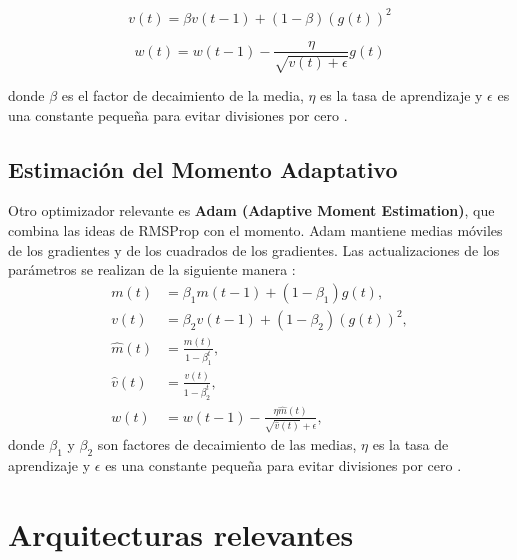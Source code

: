 \[
v(t) = \beta v(t-1) + (1-\beta) (g(t))^2
\]

\[
w(t) = w(t-1) - \frac{\eta}{\sqrt{v(t) + \epsilon}} g(t)
\]

donde \(\beta\) es el factor de decaimiento de la media, \(\eta\) es la tasa de aprendizaje y \(\epsilon\) es una constante pequeña para evitar divisiones por cero \citep{pajares2021aprendizaje}.




\subsection{Estimación del Momento Adaptativo}

Otro optimizador relevante es \textbf{Adam (Adaptive Moment Estimation)}, que combina las ideas de RMSProp con el momento. Adam mantiene medias móviles de los gradientes y de los cuadrados de los gradientes. Las actualizaciones de los parámetros se realizan de la siguiente manera \citep{pajares2021aprendizaje}:
\begin{align*}
    m(t) &= \beta_1 m(t-1) + (1-\beta_1) g(t), \\
    v(t) &= \beta_2 v(t-1) + (1-\beta_2) (g(t))^2, \\
    \hat{m}(t) &= \frac{m(t)}{1 - \beta_1^t}, \\
    \hat{v}(t) &= \frac{v(t)}{1 - \beta_2^t}, \\
    w(t) &= w(t-1) - \frac{\eta \hat{m}(t)}{\sqrt{\hat{v}(t)} + \epsilon},
\end{align*}
donde \(\beta_1\) y \(\beta_2\) son factores de decaimiento de las medias, \(\eta\) es la tasa de aprendizaje y \(\epsilon\) es una constante pequeña para evitar divisiones por cero \citep{pajares2021aprendizaje}.































\section{Arquitecturas relevantes} \label{Subsec: 3_2}


